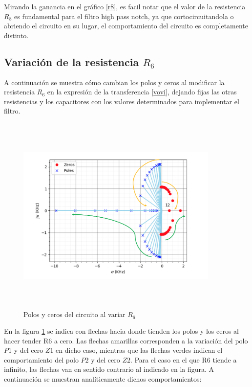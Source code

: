 Mirando la ganancia en el gr\'afico \ref{r8}, es facil notar que el valor de la resistencia $R_8$ es fundamental para el filtro high pass notch, ya que cortocircuitandola o abriendo el circuito en su lugar, el comportamiento del circuito es completamente distinto.

\subsection{Variaci\'on de la resistencia $R_6$}

A continuaci\'on se muestra c\'omo cambian los polos y ceros al modificar la resistencia $R_6$ en la expresi\'on de la transferencia \ref{vovi}, dejando fijas las otras resistencias y los capacitores con los valores determinados para implementar el filtro.


\begin{figure}[H] %
	\centering
	\includegraphics[width=10cm,height=10cm,keepaspectratio]{../EJ1/00GRAFICOS/r6.png}
	\caption{Polos y ceros del circuito al variar $R_6$}
	\label{r6}
\end{figure}

En la figura \ref{r6} se indica con flechas hacia donde tienden los polos y los ceros al hacer tender R6 a cero. Las flechas amarillas corresponden a la variaci\'on del polo $P1$ y del cero $Z1$ en dicho caso, mientras que las flechas verdes indican el comportamiento del polo $P2$ y del cero $Z2$. Para el caso en el que R6 tiende a infinito, las flechas van en sentido contrario al indicado en la figura. A continuaci\'on se muestran anal\'iticamente dichos comportamientos:

